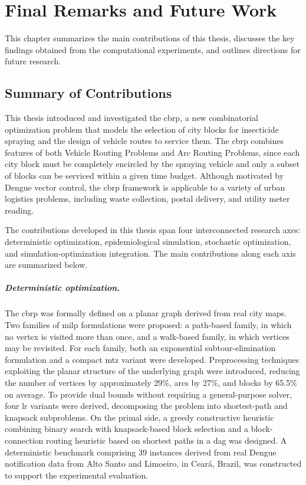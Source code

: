 \chapter{Final Remarks and Future Work}\label{chap:final-remarks-and-future-work}\label{chap:conclusions}

This chapter summarizes the main contributions of this thesis, discusses the
key findings obtained from the computational experiments, and outlines
directions for future research.

\section{Summary of Contributions}

This thesis introduced and investigated the \gls{cbrp}, a new combinatorial
optimization problem that models the selection of city blocks for insecticide
spraying and the design of vehicle routes to service them. The \gls{cbrp}
combines features of both Vehicle Routing Problems and Arc Routing Problems,
since each city block must be completely encircled by the spraying vehicle and
only a subset of blocks can be serviced within a given time budget. Although
motivated by Dengue vector control, the \gls{cbrp} framework is applicable to a
variety of urban logistics problems, including waste collection, postal
delivery, and utility meter reading.

The contributions developed in this thesis span four interconnected research
axes: deterministic optimization, epidemiological simulation, stochastic
optimization, and simulation-optimization integration. The main contributions
along each axis are summarized below.

\paragraph{Deterministic optimization.}
The \gls{cbrp} was formally defined on a planar graph derived from real city
maps. Two families of \gls{milp} formulations were proposed: a path-based
family, in which no vertex is visited more than once, and a walk-based family,
in which vertices may be revisited. For each family, both an exponential
subtour-elimination formulation and a compact \gls{mtz} variant were developed.
Preprocessing techniques exploiting the planar structure of the underlying graph
were introduced, reducing the number of vertices by approximately 29\%, arcs by
27\%, and blocks by 65.5\% on average. To provide dual bounds without requiring
a general-purpose solver, four \gls{lr} variants were derived, decomposing the
problem into shortest-path and knapsack subproblems. On the primal side, a
greedy constructive heuristic combining binary search with knapsack-based block
selection and a block-connection routing heuristic based on shortest paths in a
\gls{dag} was designed. A deterministic benchmark comprising 39 instances
derived from real Dengue notification data from Alto Santo and Limoeiro, in
Cear\'{a}, Brazil, was constructed to support the experimental evaluation.


